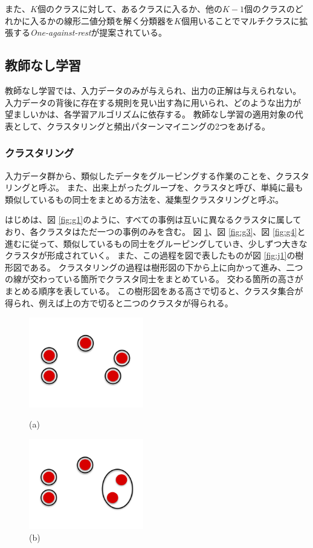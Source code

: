 \documentclass[titlepage,12pt]{jreport}
\def\ex{\noindent{{\bf 例}：}}
\begin{document}
また、$K$個のクラスに対して、あるクラスに入るか、他の$K-1$個のクラスのどれかに入るかの線形二値分類を解く分類器を$K$個用いることでマルチクラスに拡張する{\it One-against-rest}が提案されている。
\subsection{教師なし学習}
教師なし学習では、入力データのみが与えられ、出力の正解は与えられない。 入力データの背後に存在する規則を見い出す為に用いられ、どのような出力が望ましいかは、各学習アルゴリズムに依存する。 教師なし学習の適用対象の代表として、クラスタリングと頻出パターンマイニングの2つをあげる。
\subsubsection{クラスタリング}
入力データ群から、類似したデータをグルーピングする作業のことを、クラスタリングと呼ぶ。 また、出来上がったグループを、クラスタと呼び、単純に最も類似しているもの同士をまとめる方法を、凝集型クラスタリングと呼ぶ。

\ex はじめは、図 \ref{fig:g1}のように、すべての事例は互いに異なるクラスタに属しており、各クラスタはただ一つの事例のみを含む。 図 \ref{fig:g2}、図 \ref{fig:g3}、図 \ref{fig:g4}と進むに従って、類似しているもの同士をグルーピングしていき、少しずつ大きなクラスタが形成されていく。 また、この過程を図で表したものが図 \ref{fig:j1}の樹形図である。 クラスタリングの過程は樹形図の下から上に向かって進み、二つの線が交わっている箇所でクラスタ同士をまとめている。 交わる箇所の高さがまとめる順序を表している。 この樹形図をある高さで切ると、クラスタ集合が得られ、例えば上の方で切ると二つのクラスタが得られる。

\begin{figure}[htbp]
	\begin{minipage}{0.50\hsize}
		\begin{center}
			\includegraphics[width = 50mm,bb = 0 0 258 203]{img/gyou1.png}
		\end{center}
		\caption{(a)}
		\label{fig:g1}
	\end{minipage}
	\begin{minipage}{0.50\hsize}
		\begin{center}
			\includegraphics[width = 50mm,bb = 0 0 258 203]{img/gyou2.png}
		\end{center}
		\caption{(b)}
		\label{fig:g2}
	\end{minipage}
\end{figure}
\end{document}
